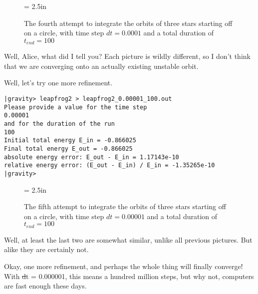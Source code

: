 \begin{figure}[htb]
\begin{center}
\epsfxsize = 2.5in
\caption[Three stars on a circle, leapfrog, $dt = 0.0001$, $t_{end} = 100$]
{The fourth attempt to integrate the orbits of three stars
starting off on a circle, with time step $dt = 0.0001$ and a total
duration of $t_{end} = 100$}
\label{fig:leap2-0.0001-100}
\end{center}
\end{figure}

\abc

\bob
Well, Alice, what did I tell you?  Each picture is wildly different,
so I don't think that we are converging onto an actually existing
unstable orbit.

\alice
Well, let's try one more refinement.

\cba

\begin{small}
\begin{verbatim}
|gravity> leapfrog2 > leapfrog2_0.00001_100.out
Please provide a value for the time step
0.00001
and for the duration of the run
100
Initial total energy E_in = -0.866025
Final total energy E_out = -0.866025
absolute energy error: E_out - E_in = 1.17143e-10
relative energy error: (E_out - E_in) / E_in = -1.35265e-10
|gravity>
\end{verbatim}
\end{small}

\begin{figure}[htb]
\begin{center}
\epsfxsize = 2.5in
\caption[Three stars on a circle, leapfrog, $dt = 0.00001$, $t_{end} = 100$]
{The fifth attempt to integrate the orbits of three stars
starting off on a circle, with time step $dt = 0.00001$ and a total
duration of $t_{end} = 100$}
\label{fig:leap2-0.00001-100}
\end{center}
\end{figure}

\abc

\alice
Well, at least the last two are somewhat similar, unlike all previous
pictures.  But alike they are certainly not.

\bob
Okay, one more refinement, and perhaps the whole thing will finally
converge!  With {\st dt = 0.000001}, this means a hundred million steps,
but why not, computers are fast enough these days.

\cba

